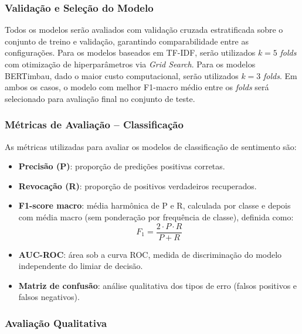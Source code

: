 \documentclass{IEEEtran}
\begin{document}
\subsubsection{Validação e Seleção do Modelo}
\label{subsubsec:validation}
Todos os modelos serão avaliados com validação cruzada estratificada sobre o conjunto de treino e validação, garantindo comparabilidade entre as configurações. Para os modelos baseados em TF-IDF, serão utilizados $k=5$ \textit{folds} com otimização de hiperparâmetros via \textit{Grid Search}. Para os modelos BERTimbau, dado o maior custo computacional, serão utilizados $k=3$ \textit{folds}. Em ambos os casos, o modelo com melhor F1-macro médio entre os \textit{folds} será selecionado para avaliação final no conjunto de teste.

\subsubsection{Métricas de Avaliação -- Classificação}
\label{subsubsec:metrics_classification}

As métricas utilizadas para avaliar os modelos de classificação de sentimento são:

\begin{itemize}[noitemsep]
  \item \textbf{Precisão (P)}: proporção de predições positivas corretas.
  \item \textbf{Revocação (R)}: proporção de positivos verdadeiros recuperados.
  \item \textbf{F1-score macro}: média harmônica de P e R, calculada por classe e depois com média macro (sem ponderação por frequência de classe), definida como:
    \begin{equation}
      F_1 = \frac{2 \cdot P \cdot R}{P + R}
      \label{eq:f1}
    \end{equation}
  \item \textbf{AUC-ROC}: área sob a curva ROC, medida de discriminação do modelo independente do limiar de decisão.
  \item \textbf{Matriz de confusão}: análise qualitativa dos tipos de erro (falsos positivos e falsos negativos).
\end{itemize}

\subsubsection{Avaliação Qualitativa}
\label{subsubsec:qual_classification}
\end{document}
